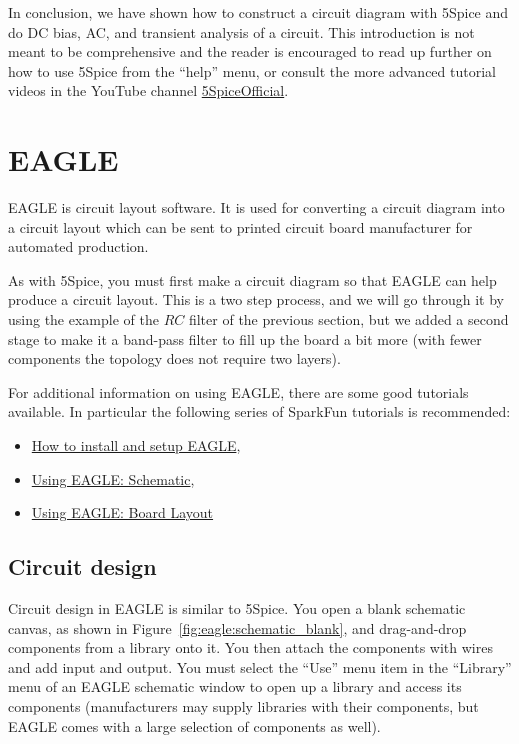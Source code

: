 \documentclass{article}
\begin{document}
In conclusion, we have shown how to construct a circuit diagram with 5Spice and do DC bias, AC, and transient analysis of a circuit. This introduction is not meant to be comprehensive and the reader is encouraged to read up further on how to use 5Spice from the ``help'' menu, or consult the more advanced tutorial videos in the YouTube channel \href{https://www.youtube.com/channel/UCC1qbSb4QSiS_0mZziTIxTA}{5SpiceOfficial}.


\section{EAGLE}
EAGLE is circuit layout software. It is used for converting a circuit diagram into a circuit layout which can be sent to printed circuit board manufacturer for automated production.

As with 5Spice, you must first make a circuit diagram so that EAGLE can help produce a circuit layout. This is a two step process, and we will go through it by using the example of the $RC$ filter of the previous section, but we added a second stage to make it a band-pass filter to fill up the board a bit more (with fewer components the topology does not require two layers).

For additional information on using EAGLE, there are some good tutorials available.  In particular the following series of SparkFun tutorials is recommended:
\begin{itemize}
\item \href{https://learn.sparkfun.com/tutorials/how-to-install-and-setup-eagle}{How to install and setup EAGLE},
\item \href{https://learn.sparkfun.com/tutorials/using-eagle-schematic}{Using EAGLE: Schematic},
\item \href{https://learn.sparkfun.com/tutorials/using-eagle-board-layout}{Using EAGLE: Board Layout}
\end{itemize}

\subsection{Circuit design}
Circuit design in EAGLE is similar to 5Spice. You open a blank schematic canvas, as shown in Figure~\ref{fig:eagle:schematic_blank}, and drag-and-drop components from a library onto it. You then attach the components with wires and add input and output. You must select the ``Use'' menu item in the ``Library'' menu of an EAGLE schematic window to open up a library and access its components (manufacturers may supply libraries with their components, but EAGLE comes with a large selection of components as well).
\end{document}

